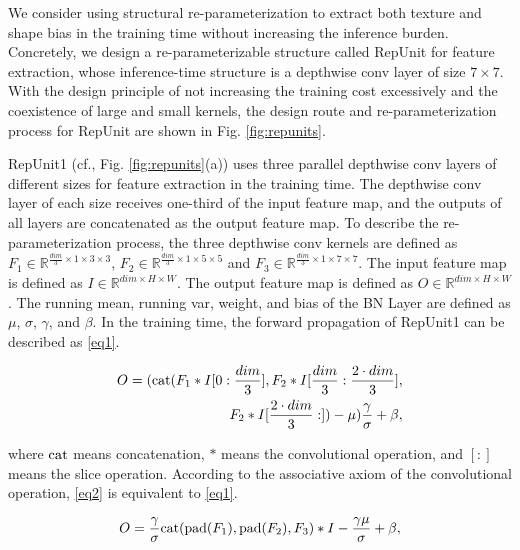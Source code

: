 \documentclass[preprint,12pt]{elsarticle}
\begin{document}
We consider using structural re-parameterization to extract both texture and shape bias in the training time without increasing the inference burden. Concretely, we design a re-parameterizable structure called RepUnit for feature extraction, whose inference-time structure is a depthwise conv layer of size $7 \times 7$. With the design principle of not increasing the training cost excessively and the coexistence of large and small kernels, the design route and re-parameterization process for RepUnit are shown in Fig. \ref{fig:repunits}.

RepUnit1 (cf., Fig. \ref{fig:repunits}(a)) uses three parallel depthwise conv layers of different sizes for feature extraction in the training time. The depthwise conv layer of each size receives one-third of the input feature map, and the outputs of all layers are concatenated as the output feature map. To describe the re-parameterization process, the three depthwise conv kernels are defined as $F_1 \in \mathbb{R}^{\frac{dim}{3} \times 1 \times 3 \times 3}$, $F_2 \in \mathbb{R}^{\frac{dim}{3} \times 1 \times 5 \times 5}$ and $F_3 \in \mathbb{R}^{\frac{dim}{3} \times 1 \times 7 \times 7}$. The input feature map is defined as $I \in \mathbb{R}^{dim \times H \times W}$. The output feature map is defined as $O \in \mathbb{R}^{dim \times H \times W}$. The running mean, running var, weight, and bias of the BN Layer are defined as $\mu$, $\sigma$, $\gamma$, and $\beta$. In the training time, the forward propagation of RepUnit1 can be described as \eqref{eq1}.

\begin{equation}
\begin{aligned}
    O=({\rm cat}(F_1 * I[0:\frac{dim}{3}], F_2 * I[\frac{dim}{3}:\frac{2 \cdot dim}{3}],\\ F_2 * I[\frac{2 \cdot dim}{3}:]) - \mu) \frac{\gamma}{\sigma}+\beta,
    \label{eq1}
\end{aligned}
\end{equation}

\noindent
where ${\rm cat}$ means concatenation, $*$ means the convolutional operation, and $[:]$ means the slice operation. According to the associative axiom of the convolutional operation, \eqref{eq2} is equivalent to \eqref{eq1}.

\begin{equation}
   O = \frac{\gamma}{\sigma}{\rm cat}({\rm pad}(F_1), {\rm pad}(F_2), F_3)*I -\frac{\gamma\mu}{\sigma} + \beta,
    \label{eq2}
\end{equation}
\end{document}

